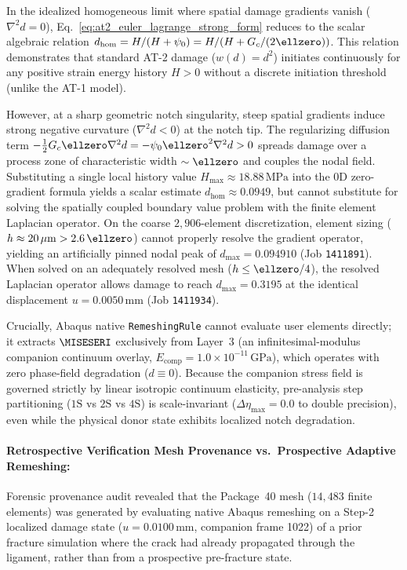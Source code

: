 \begin{enumerate}
In the idealized homogeneous limit where spatial damage gradients vanish ($\nabla^2 d = 0$), Eq.~\eqref{eq:at2_euler_lagrange_strong_form} reduces to the scalar algebraic relation $d_{\mathrm{hom}} = H / (H + \psi_0) = H / (H + G_c/(2\ellzero))$. This relation demonstrates that standard AT-2 damage ($w(d)=d^2$) initiates continuously for any positive strain energy history $H > 0$ without a discrete initiation threshold (unlike the AT-1 model). 

However, at a sharp geometric notch singularity, steep spatial gradients induce strong negative curvature ($\nabla^2 d < 0$) at the notch tip. The regularizing diffusion term $-\frac{1}{2} G_c \ellzero \nabla^2 d = -\psi_0 \ellzero^2 \nabla^2 d > 0$ spreads damage over a process zone of characteristic width $\sim \ellzero$ and couples the nodal field. Substituting a single local history value $H_{\max} \approx 18.88\,\mathrm{MPa}$ into the 0D zero-gradient formula yields a scalar estimate $d_{\mathrm{hom}} \approx 0.0949$, but cannot substitute for solving the spatially coupled boundary value problem with the finite element Laplacian operator. On the coarse $2{,}906$-element discretization, element sizing ($h \approx 20\,\mu\mathrm{m} > 2.6\,\ellzero$) cannot properly resolve the gradient operator, yielding an artificially pinned nodal peak of $d_{\max} = 0.094910$ (Job \texttt{1411891}). When solved on an adequately resolved mesh ($h \le \ellzero/4$), the resolved Laplacian operator allows damage to reach $d_{\max} = 0.3195$ at the identical displacement $u = 0.0050\,\mathrm{mm}$ (Job \texttt{1411934}). 

Crucially, Abaqus native \texttt{RemeshingRule} cannot evaluate user elements directly; it extracts $\MISESERI$ exclusively from Layer~3 (an infinitesimal-modulus companion continuum overlay, $E_{\mathrm{comp}} = 1.0\times 10^{-11}\,\mathrm{GPa}$), which operates with zero phase-field degradation ($d \equiv 0$). Because the companion stress field is governed strictly by linear isotropic continuum elasticity, pre-analysis step partitioning ($1\mathrm{S}$ vs $2\mathrm{S}$ vs $4\mathrm{S}$) is scale-invariant ($\Delta \eta_{\max} = 0.0$ to double precision), even while the physical donor state exhibits localized notch degradation.

\paragraph{Retrospective Verification Mesh Provenance vs.\ Prospective Adaptive Remeshing:}
Forensic provenance audit revealed that the Package~40 mesh ($14{,}483$ finite elements) was generated by evaluating native Abaqus remeshing on a Step-2 localized damage state ($u = 0.0100\,\mathrm{mm}$, companion frame 1022) of a prior fracture simulation where the crack had already propagated through the ligament, rather than from a prospective pre-fracture state. 


\end{enumerate}
